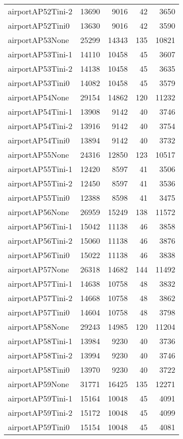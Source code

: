 \begin{longtable}{lrrrr}
airportAP52Tini-2 & 13690 & 9016 & 42 & 3650 \\
airportAP52Tini0 & 13630 & 9016 & 42 & 3590 \\
airportAP53None & 25299 & 14343 & 135 & 10821 \\
airportAP53Tini-1 & 14110 & 10458 & 45 & 3607 \\
airportAP53Tini-2 & 14138 & 10458 & 45 & 3635 \\
airportAP53Tini0 & 14082 & 10458 & 45 & 3579 \\
airportAP54None & 29154 & 14862 & 120 & 11232 \\
airportAP54Tini-1 & 13908 & 9142 & 40 & 3746 \\
airportAP54Tini-2 & 13916 & 9142 & 40 & 3754 \\
airportAP54Tini0 & 13894 & 9142 & 40 & 3732 \\
airportAP55None & 24316 & 12850 & 123 & 10517 \\
airportAP55Tini-1 & 12420 & 8597 & 41 & 3506 \\
airportAP55Tini-2 & 12450 & 8597 & 41 & 3536 \\
airportAP55Tini0 & 12388 & 8598 & 41 & 3475 \\
airportAP56None & 26959 & 15249 & 138 & 11572 \\
airportAP56Tini-1 & 15042 & 11138 & 46 & 3858 \\
airportAP56Tini-2 & 15060 & 11138 & 46 & 3876 \\
airportAP56Tini0 & 15022 & 11138 & 46 & 3838 \\
airportAP57None & 26318 & 14682 & 144 & 11492 \\
airportAP57Tini-1 & 14638 & 10758 & 48 & 3832 \\
airportAP57Tini-2 & 14668 & 10758 & 48 & 3862 \\
airportAP57Tini0 & 14604 & 10758 & 48 & 3798 \\
airportAP58None & 29243 & 14985 & 120 & 11204 \\
airportAP58Tini-1 & 13984 & 9230 & 40 & 3736 \\
airportAP58Tini-2 & 13994 & 9230 & 40 & 3746 \\
airportAP58Tini0 & 13970 & 9230 & 40 & 3722 \\
airportAP59None & 31771 & 16425 & 135 & 12271 \\
airportAP59Tini-1 & 15164 & 10048 & 45 & 4091 \\
airportAP59Tini-2 & 15172 & 10048 & 45 & 4099 \\
airportAP59Tini0 & 15154 & 10048 & 45 & 4081 \\

\end{longtable}
